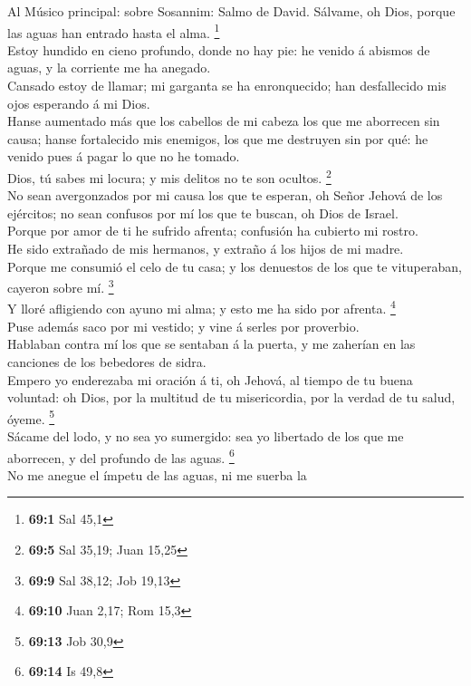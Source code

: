  Al Músico principal: sobre Sosannim: Salmo de David.
Sálvame, oh Dios, porque las aguas han entrado hasta el alma.
\footnote{\textbf{69:1} Sal 45,1}\\
 Estoy hundido en cieno profundo, donde no hay pie: he
venido á abismos de aguas, y la corriente me ha anegado.\\
 Cansado estoy de llamar; mi garganta se ha enronquecido;
han desfallecido mis ojos esperando á mi Dios.\\
 Hanse aumentado más que los cabellos de mi cabeza los que
me aborrecen sin causa; hanse fortalecido mis enemigos, los que me
destruyen sin por qué: he venido pues á pagar lo que no he tomado.\\
 Dios, tú sabes mi locura; y mis delitos no te son
ocultos. \footnote{\textbf{69:5} Sal 35,19; Juan 15,25}\\
 No sean avergonzados por mi causa los que te esperan, oh
Señor Jehová de los ejércitos; no sean confusos por mí los que te
buscan, oh Dios de Israel.\\
 Porque por amor de ti he sufrido afrenta; confusión ha
cubierto mi rostro.\\
 He sido extrañado de mis hermanos, y extraño á los hijos
de mi madre.\\
 Porque me consumió el celo de tu casa; y los denuestos de
los que te vituperaban, cayeron sobre mí. \footnote{\textbf{69:9} Sal
  38,12; Job 19,13}\\
 Y lloré afligiendo con ayuno mi alma; y esto me ha sido
por afrenta. \footnote{\textbf{69:10} Juan 2,17; Rom 15,3}\\
 Puse además saco por mi vestido; y vine á serles por
proverbio.\\
 Hablaban contra mí los que se sentaban á la puerta, y me
zaherían en las canciones de los bebedores de sidra.\\
 Empero yo enderezaba mi oración á ti, oh Jehová, al
tiempo de tu buena voluntad: oh Dios, por la multitud de tu
misericordia, por la verdad de tu salud, óyeme. \footnote{\textbf{69:13}
  Job 30,9}\\
 Sácame del lodo, y no sea yo sumergido: sea yo libertado
de los que me aborrecen, y del profundo de las aguas. \footnote{\textbf{69:14}
  Is 49,8}\\
 No me anegue el ímpetu de las aguas, ni me suerba la
